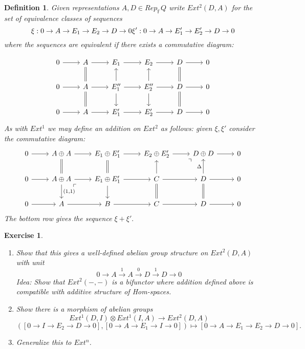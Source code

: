 \documentclass{book}
\newtheorem{definition}[theorem]{Definition}
\newtheorem {exercise}[theorem] {Exercise}
\begin{document}
\begin{definition}
Given representations $A,D\in Rep_{\mathbb{F}}Q$ write $Ext^2(D,A)$ for the set of equivalence classes of sequences $$\xi : 0 \rightarrow A \rightarrow E_1 \rightarrow E_2 \rightarrow D \rightarrow 0 \\ \xi ': 0 \rightarrow A \rightarrow E_1' \rightarrow E_2' \rightarrow D \rightarrow 0$$ where the sequences are equivalent if there exists a commutative diagram: 

$$\begin{tikzcd}
            0 \arrow{r}  & A \arrow{r} \arrow[d, equal] & E_1 \arrow{r} & E_2 \arrow{r} &D \arrow{r} & 0  \\ 
	0 \arrow{r}  & A \arrow{r} \arrow[d, equal] & E_1'' \arrow{r} \arrow{d} \arrow{u} & E_2'' \arrow{r} \arrow{d} \arrow{u} &D \arrow{r} \arrow[d, equal] \arrow[u,equal] & 0  \\ 
            0 \arrow{r}  & A \arrow{r}  & E_1' \arrow{r} & E_2' \arrow{r} &D \arrow{r} & 0   
            \end{tikzcd}$$
As with $Ext^1$ we may define an addition on $Ext^2$ as follows: given $\xi, \xi '$ consider the commutative diagram:
$$\begin{tikzcd}
            0 \arrow{r}  & A \oplus A \arrow{r} \arrow[d, equal] & E_1 \oplus E_1' \arrow{r} & E_2 \oplus E_2' \arrow{r} &D\oplus D \arrow{r} & 0  \\ 
	0 \arrow{r}  & A \oplus A \arrow{r} \arrow{d}{(1,1)}  \arrow[dr, phantom, "\ulcorner", very near start] & E_1 \oplus E_1'  \arrow{r} \arrow{d} \arrow[u, equal] & C \arrow{r} \arrow[d,equal] \arrow{u}  \arrow[ur, phantom, "\urcorner", very near end] &D \arrow{r} \arrow[d, equal] \arrow{u}{ \Delta } & 0  \\ 
            0 \arrow{r}  & A \arrow{r}  & B \arrow{r} & C \arrow{r} &D \arrow{r} & 0   
            \end{tikzcd}$$
The bottom row gives the sequence $\xi + \xi '.$
\end{definition}

\begin{exercise} 
\begin{enumerate}
\item Show that this gives a well-defined abelian group structure on $Ext^2(D,A)$ with unit $$0 \rightarrow A \xrightarrow{1} A \xrightarrow{0} D \xrightarrow{1} D \rightarrow 0$$
	Idea: Show that $Ext^2(-,-)$ is a bifunctor where addition defined above is compatible with additive structure of Hom-spaces. 
\item Show there is a morphism of abelian groups \[Ext^1(D,I) \otimes Ext^1(I,A) \rightarrow Ext^2(D,A)  \] \[  ([0 \rightarrow I  \rightarrow E_2 \rightarrow D \rightarrow 0],[0 \rightarrow A  \rightarrow E_1 \rightarrow I \rightarrow 0]) \mapsto [
            0 \rightarrow A \rightarrow E_1 \rightarrow E_2  \rightarrow D \rightarrow 0 ].\]
\item Generalize this to $Ext^n$.
\end{enumerate} 
\end{exercise} 
\end{document}
